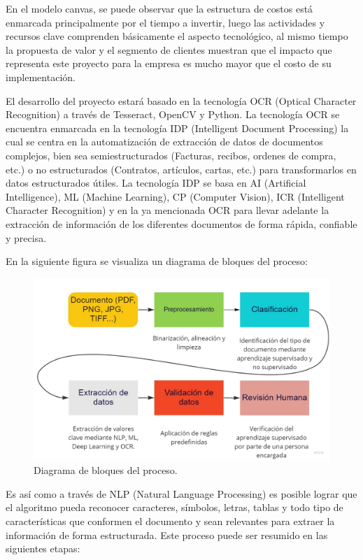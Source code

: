 \documentclass[
11pt, %
]{charter}
\begin{document}
\begin{•}
En el modelo canvas, se puede observar que la estructura de costos está enmarcada principalmente por el tiempo a invertir, luego las actividades y recursos clave comprenden básicamente el aspecto tecnológico, al mismo tiempo la propuesta de valor y el segmento de clientes muestran que el impacto que representa este proyecto para la empresa es mucho mayor que el costo de su implementación. 

El desarrollo del proyecto estará basado en la tecnología OCR (Optical Character Recognition) a través de Tesseract, OpenCV y Python. La tecnología OCR se encuentra enmarcada en la tecnología IDP (Intelligent Document Processing) la cual se centra en la automatización de extracción de datos de documentos complejos, bien sea semiestructurados (Facturas, recibos, ordenes de compra, etc.) o no estructurados (Contratos, artículos, cartas, etc.) para transformarlos en  datos estructurados útiles. La tecnología IDP se basa en AI (Artificial Intelligence), ML (Machine Learning), CP (Computer Vision), ICR (Intelligent Character Recognition) y en la ya mencionada OCR para llevar adelante la extracción de información de los diferentes documentos de forma rápida, confiable y precisa.

En la siguiente figura se visualiza un diagrama de bloques del proceso: \newpage

\begin{figure}[htpb]
\centering 
\includegraphics[width=.8\textwidth]{./Figuras/DiagBloq.jpg}
\caption{Diagrama de bloques del proceso.}
\label{fig:DiagBloq}
\end{figure}


Es así como a través de NLP (Natural Language Processing) es posible lograr que el algoritmo pueda reconocer caracteres, símbolos, letras, tablas y todo tipo de características que conformen el documento y sean relevantes para extraer la información de forma estructurada. Este proceso puede ser resumido en las siguientes etapas:


\end{•}
\end{document}

